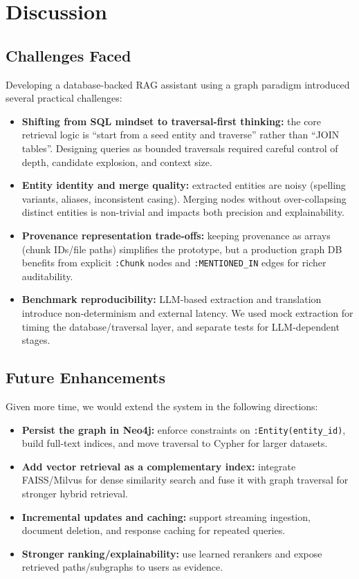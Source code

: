 \section{Discussion}

\subsection{Challenges Faced}
Developing a database-backed RAG assistant using a graph paradigm introduced several practical challenges:
\begin{itemize}
    \item \textbf{Shifting from SQL mindset to traversal-first thinking:} the core retrieval logic is ``start from a seed entity and traverse'' rather than ``JOIN tables''. Designing queries as bounded traversals required careful control of depth, candidate explosion, and context size.
    \item \textbf{Entity identity and merge quality:} extracted entities are noisy (spelling variants, aliases, inconsistent casing). Merging nodes without over-collapsing distinct entities is non-trivial and impacts both precision and explainability.
    \item \textbf{Provenance representation trade-offs:} keeping provenance as arrays (chunk IDs/file paths) simplifies the prototype, but a production graph DB benefits from explicit \texttt{:Chunk} nodes and \texttt{:MENTIONED\_IN} edges for richer auditability.
    \item \textbf{Benchmark reproducibility:} LLM-based extraction and translation introduce non-determinism and external latency. We used mock extraction for timing the database/traversal layer, and separate tests for LLM-dependent stages.
\end{itemize}

\subsection{Future Enhancements}
Given more time, we would extend the system in the following directions:
\begin{itemize}
    \item \textbf{Persist the graph in Neo4j:} enforce constraints on \texttt{:Entity(entity\_id)}, build full-text indices, and move traversal to Cypher for larger datasets.
    \item \textbf{Add vector retrieval as a complementary index:} integrate FAISS/Milvus for dense similarity search and fuse it with graph traversal for stronger hybrid retrieval.
    \item \textbf{Incremental updates and caching:} support streaming ingestion, document deletion, and response caching for repeated queries.
    \item \textbf{Stronger ranking/explainability:} use learned rerankers and expose retrieved paths/subgraphs to users as evidence.
\end{itemize}

